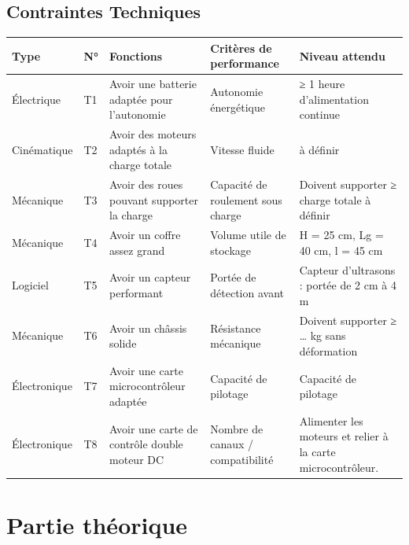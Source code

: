 \documentclass[a4paper,12pt]{report}  %
\begin{document}
\subsection{Contraintes Techniques}

{\fontsize{10pt}{12pt}\selectfont 
\begin{longtable}{|l|l|p{4cm}|p{4cm}|p{4cm}|}
	\hline
	\textbf{Type} & \textbf{N°} & \textbf{Fonctions} 
	& \textbf{Critères de performance} & \textbf{Niveau attendu} \\
	\hline
	\endhead
	
	\hline
	\endfoot
	
	\hline
	Électrique & T1 & Avoir une batterie adaptée pour l'autonomie &
	Autonomie énergétique & ≥ 1 heure d'alimentation continue \\
	
	\hline
	Cinématique & T2 & Avoir des moteurs adaptés à la charge totale &
	Vitesse fluide & à définir \\
	
	\hline
	Mécanique & T3 & Avoir des roues pouvant supporter la charge & Capacité
	de roulement sous charge & Doivent supporter ≥ charge totale à définir \\
	
	\hline
	Mécanique & T4 & Avoir un coffre assez grand & Volume utile de stockage
	& H = 25 cm, Lg = 40 cm, l = 45 cm \\
	
	\hline
	Logiciel & T5 & Avoir un capteur performant & Portée de détection avant
	& Capteur d'ultrasons : portée de 2 cm à 4 m  \\
	
	\hline
	Mécanique & T6 & Avoir un châssis solide & Résistance mécanique &
	Doivent supporter ≥ \ldots{} kg sans déformation \\
	
	\hline
	Électronique & T7 & Avoir une carte microcontrôleur adaptée & Capacité
	de pilotage & Capacité de pilotage \\
	
	\hline
	Électronique & T8 & Avoir une carte de contrôle double moteur DC &
	Nombre de canaux / compatibilité & Alimenter les moteurs et relier à la
	carte microcontrôleur. \\
	
\end{longtable}
}

\section{Partie théorique}
\end{document}
